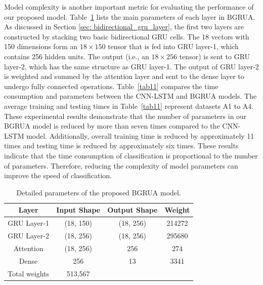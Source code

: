 \documentclass[preprint,12pt]{elsarticle}
\begin{document}
Model complexity is another important metric for evaluating the performance of our proposed model. 
Table~\ref{tab10} lists the main parameters of each layer in BGRUA. As discussed in Section \ref{sec: bidirectional_gru_layer}, the first two layers are constructed by stacking two basic bidirectional GRU cells. The 18 vectors with 150 dimensions form an $18 \times 150$ tensor that is fed into GRU layer-1, which contains 256 hidden units. The output (i.e., an $18 \times 256$ tensor) is sent to GRU layer-2, which has the same structure as GRU layer-1. The output of GRU layer-2 is weighted and summed by the attention layer and sent to the dense layer to undergo fully connected operations. Table~\ref{tab11} compares the time consumption and parameters between the CNN-LSTM and BGRUA models.
The average training and testing times in Table~\ref{tab11} represent datasets A1 to A4. These experimental results demonstrate that the number of parameters in our BGRUA model is reduced by more than seven times compared to the CNN-LSTM model. Additionally, overall training time is reduced by approximately 11 times and testing time is reduced by approximately six times. These results indicate that the time consumption of classification is proportional to the number of parameters. Therefore, reducing the complexity of model parameters can improve the speed of classification.



\begin{table}[]
\caption{Detailed parameters of the proposed BGRUA model.}
\centering
\begin{tabular}{cccc}
\hline
\multicolumn{1}{c|}{\textbf{Layer}}   & \multicolumn{1}{c|}{\textbf{Input Shape}} & \multicolumn{1}{c|}{\textbf{Output Shape}} & \textbf{Weight} \\ \hline
\multicolumn{1}{c|}{GRU Layer-1} & \multicolumn{1}{c|}{(18, 150)}            & \multicolumn{1}{c|}{(18, 256)}             & 214272          \\ \hline
\multicolumn{1}{c|}{GRU Layer-2} & \multicolumn{1}{c|}{(18, 256)}            & \multicolumn{1}{c|}{(18, 256)}             & 295680          \\ \hline
\multicolumn{1}{c|}{Attention}        & \multicolumn{1}{c|}{(18, 256)}            & \multicolumn{1}{c|}{256}                   & 274             \\ \hline
\multicolumn{1}{c|}{Dense}            & \multicolumn{1}{c|}{256}                  & \multicolumn{1}{c|}{13}                    & 3341            \\ \hline
Total weights                         & 513,567                                   &                                            &                 \\ \hline
\end{tabular}
\label{tab10}
\end{table}
\end{document}
